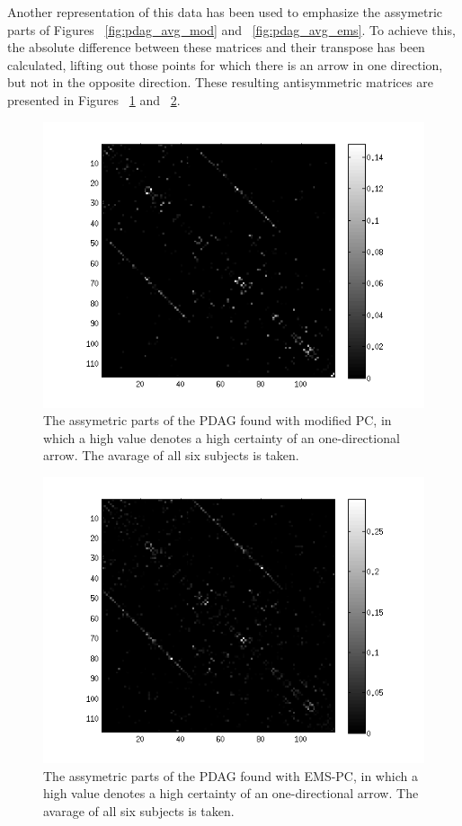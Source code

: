 \documentclass[a4paper, 10pt, english, onecolumn]{article}
\begin{document}
Another representation of this data has been used to emphasize the assymetric parts of Figures ~\ref{fig:pdag_avg_mod} and ~\ref{fig:pdag_avg_ems}.
To achieve this, the absolute difference between these matrices and their transpose has been calculated, lifting out those points for which there is an arrow in one direction, but not in the opposite direction.
These resulting antisymmetric matrices are presented in Figures ~\ref{fig:pdag_avg_antisymmetric_mod} and ~\ref{fig:pdag_avg_antisymmetric_ems}.

\begin{figure}[h!]
  \centering
  \includegraphics{images/PDAG_avg_antisymmetric_mod}
  \caption{The assymetric parts of the PDAG found with modified PC, in which a high value denotes a high certainty of an one-directional arrow. The avarage of all six subjects is taken.}
  \label{fig:pdag_avg_antisymmetric_mod}
\end{figure}

\begin{figure}[h!]
  \centering
  \includegraphics{images/PDAG_avg_antisymmetric_expl}
  \caption{The assymetric parts of the PDAG found with EMS-PC, in which a high value denotes a high certainty of an one-directional arrow. The avarage of all six subjects is taken.}
  \label{fig:pdag_avg_antisymmetric_ems}
\end{figure}
\end{document}
